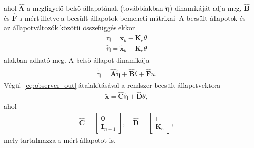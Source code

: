 ahol $\hat{\bm A}$ a megfigyelő belső állapotának (továbbiakban $\tilde{\bm \eta}$) 
dinamikáját adja meg, $\hat{\bm B}$ és $\hat{\bm F}$ a mért illetve a becsült állapotok 
bemeneti mátrixai. A becsült állapotok és az állapotváltozók közötti összefüggés ekkor
\begin{align}
    \begin{split}
    \bm \eta = \bm x_b - \bm K_e \theta \\
    \tilde{\bm \eta} = \tilde{\bm x}_b - \bm K_e \theta
    \end{split}
\end{align}
alakban adható meg. A belső állapot dinamikája
\begin{align}
    \begin{split}
    \dot{\tilde{\bm \eta}} = \hat{\bm A} \tilde{\bm \eta} + \hat{\bm B} \theta + \hat{\bm F} u.
    \end{split}
\end{align}
Végül~\eqref{eq:observer_out} átalakításával a rendszer becsült állapotvektora
\begin{align}
    \tilde{\bm x} = \hat{\bm C} \tilde{\bm \eta} + \hat{\bm D} \theta,
\end{align}
ahol
\begin{align}
    \hat{\bm C} = 
    \left[\begin{array}{c}
        \bm 0 \\ \hline
        \bm I_{n-1}
    \end{array}\right],
    \quad
    \hat{\bm D} = 
    \left[\begin{array}{c}
        1 \\ \hline
        \bm K_e
    \end{array}\right],
\end{align}
mely tartalmazza a mért állapotot is.

